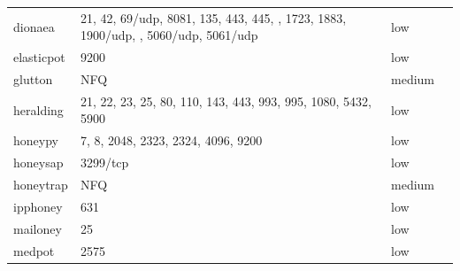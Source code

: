 \begin{table}
\begin{tabularx}{\linewidth}{l|XlX}
        dionaea \cite{dionaea2021}               & 21, 42, 69/udp, 8081, 135, 443, 445, \newline 1433, 1723, 1883, 1900/udp, \newline 3306, 5060/udp, 5061/udp & low                                                  \\
        elasticpot \cite{elasticpot2021}         & 9200                                                                                                        & low                                                  \\
        glutton \cite{glutton2021}               & NFQ                                                                                                         & medium                                                  \\
        heralding \cite{heralding2021}           & 21, 22, 23, 25, 80, 110, 143, 443, 993, 995, 1080, 5432, 5900                                               & low                                                  \\
        honeypy \cite{honeysap2021}              & 7, 8, 2048, 2323, 2324, 4096, 9200                                                                          & low                                                  \\
        honeysap \cite{honeysap2021}             & 3299/tcp                                                                                                    & low                                                  \\
        honeytrap \cite{honeytrap2021}           & NFQ                                                                                                         & medium                                                  \\
        ipphoney \cite{ipphoney2021}             & 631                                                                                                         & low                                                  \\
        mailoney                                 & 25                                                                                                          & low                                                  \\
        medpot \cite{medpot2021}                 & 2575                                                                                                        & low                                                  \\

\end{tabularx}
\end{table}
